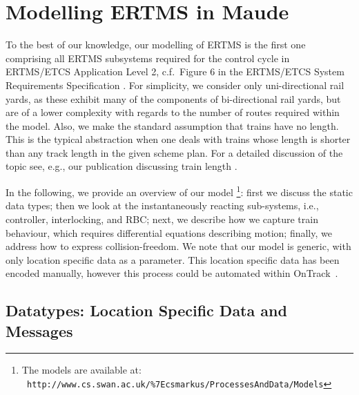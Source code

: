 \section{Modelling ERTMS in Maude}

To the best of our knowledge, our modelling of ERTMS is the first one
comprising all ERTMS subsystems required for the control cycle in
ERTMS/ETCS Application Level 2, c.f.\ Figure 6 in the ERTMS/ETCS
System Requirements Specification \cite{spec}. For simplicity, we
consider only uni-directional rail yards, as these exhibit many of the
components of bi-directional rail yards, but are of a lower complexity
with regards to the number of routes required within the model. Also,
we make the standard assumption that trains have no length. This is
the typical abstraction when one deals with trains whose length is
shorter than any track length in the given scheme plan. For a detailed
discussion of the topic see, e.g., our publication discussing train
length \cite{JamesMNRST14}.

In the following, we provide an overview of our model%
\footnote{The models are available at:\\
{\tt \footnotesize
 http://www.cs.swan.ac.uk/\%7Ecsmarkus/ProcessesAndData/Models}}: first we discuss the static
data types; then we look at the instantaneously reacting
sub-systems, i.e., controller, interlocking, and RBC; next, we
describe how we capture  train behaviour, which requires
differential equations describing motion; finally, we address how to
express collision-freedom. We note that our model is generic, with only
location specific data as a parameter. This location specific data has been encoded manually, however this process could be automated within OnTrack~\cite{james14c}.


\subsection{Datatypes: Location Specific Data and Messages}



